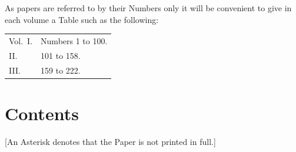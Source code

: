 \documentclass[11pt,a4paper]{book}
\begin{document}
As papers are referred to by their Numbers only it will be convenient to give in each volume a Table such as the following:

\begin{center}
\begin{tabular}{ll}
Vol.\ I. & Numbers 1 to 100. \\
\quad II. & 101 to 158. \\
\quad III. & 159 to 222.
\end{tabular}
\end{center}

\clearpage

\section*{Contents}

[An Asterisk denotes that the Paper is not printed in full.]
\end{document}
